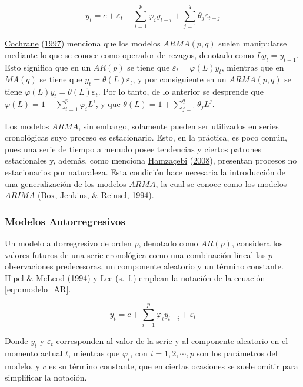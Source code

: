 \documentclass[
]{article}
\begin{document}
\begin{equation}
\label{eqn:modelo_ARMA}
y_t=c+\varepsilon_t+\sum_{i=1}^p \varphi_iy_{t-i}+\sum_{j=1}^q \theta_j \varepsilon_{t-j}
\end{equation}

\protect\hyperlink{ref-Cochrane}{Cochrane}
(\protect\hyperlink{ref-Cochrane}{1997}) menciona que los modelos
\(ARMA(p,q)\) suelen manipularse mediante lo que se conoce como operador
de rezagos, denotado como \(Ly_t=y_{t-1}\). Esto significa que en un
\(AR(p)\) se tiene que \(\varepsilon_t=\varphi(L)y_t\), mientras que en
\(MA(q)\) se tiene que \(y_t=\theta(L)\varepsilon_t\), y por
consiguiente en un \(ARMA(p,q)\) se tiene
\(\varphi(L)y_t=\theta(L)\varepsilon_t\). Por lo tanto, de lo anterior
se desprende que \(\varphi(L)=1-\sum_{i=1}^p \varphi_iL^i\), y que
\(\theta(L)=1+\sum_{j=1}^q\theta_jL^j\).

Los modelos \(ARMA\), sin embargo, solamente pueden ser utilizados en
series cronológicas suyo proceso es estacionario. Esto, en la práctica,
es poco común, pues una serie de tiempo a menudo posee tendencias y
ciertos patrones estacionales y, además, como menciona
\protect\hyperlink{ref-Hamzacebi}{Hamzaçebi}
(\protect\hyperlink{ref-Hamzacebi}{2008}), presentan procesos no
estacionarios por naturaleza. Esta condición hace necesaria la
introducción de una generalización de los modelos \(ARMA\), la cual se
conoce como los modelos \(ARIMA\)
(\protect\hyperlink{ref-box-jenkins}{Box, Jenkins, \& Reinsel, 1994}).

\subsubsection{Modelos Autorregresivos}

Un modelo autorregresivo de orden \emph{p}, denotado como \(AR(p)\),
considera los valores futuros de una serie cronológica como una
combinación lineal las \(p\) observaciones predecesoras, un componente
aleatorio y un término constante. \protect\hyperlink{ref-Hipel}{Hipel \&
McLeod} (\protect\hyperlink{ref-Hipel}{1994}) y
\protect\hyperlink{ref-Lee}{Lee} (\protect\hyperlink{ref-Lee}{s.~f.})
emplean la notación de la ecuación \ref{eqn:modelo_AR}.

\begin{equation}
\label{eqn:modelo_AR}
y_t=c+\sum_{i=1}^p \varphi_iy_{t-i}+\varepsilon_t
\end{equation}

Donde \(y_t\) y \(\varepsilon_t\) corresponden al valor de la serie y al
componente aleatorio en el momento actual \(t\), mientras que
\(\varphi_i\), con \(i=1,2,\cdots,p\) son los parámetros del modelo, y
\(c\) es su término constante, que en ciertas ocasiones se suele omitir
para simplificar la notación.
\end{document}
